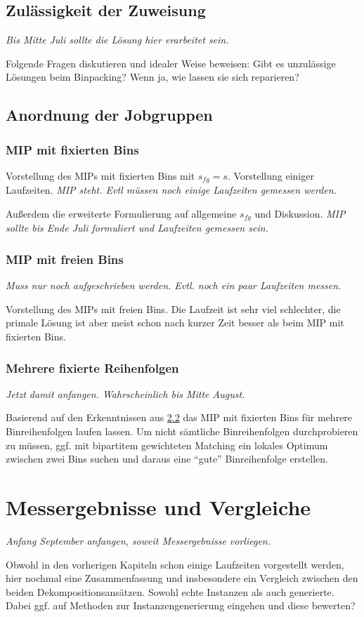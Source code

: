 \documentclass{scrreprt}
\begin{document}
\section{Zulässigkeit der Zuweisung}
\textit{Bis Mitte Juli sollte die Lösung hier erarbeitet sein.}

Folgende Fragen diskutieren und idealer Weise beweisen:
Gibt es unzulässige Lösungen beim Binpacking? Wenn ja, wie lassen sie sich reparieren?


\section{Anordnung der Jobgruppen}
\subsection{MIP mit fixierten Bins}
Vorstellung des MIPs mit fixierten Bins mit $s_{fg}=s$. Vorstellung einiger Laufzeiten. 
\textit{MIP steht. Evtl müssen noch einige Laufzeiten gemessen werden.}

Außerdem die erweiterte Formulierung auf allgemeine $s_{fg}$ und Diskussion.
\textit{MIP sollte bis Ende Juli formuliert und Laufzeiten gemessen sein.}

\subsection{MIP mit freien Bins}
\label{subsec:mipfreibins}
\textit{Muss nur noch aufgeschrieben werden. Evtl. noch ein paar Laufzeiten messen.}

Vorstellung des MIPs mit freien Bins. 
Die Laufzeit ist sehr viel schlechter, die primale Lösung ist aber meist schon nach kurzer Zeit besser als beim MIP mit fixierten Bins.

\subsection{Mehrere fixierte Reihenfolgen}
\textit{Jetzt damit anfangen. Wahrscheinlich bis Mitte August.}

Basierend auf den Erkenntnissen aus \ref{subsec:mipfreibins} das MIP mit fixierten Bins für mehrere Binreihenfolgen laufen lassen.
Um nicht sämtliche Binreihenfolgen durchprobieren zu müssen,
ggf. mit bipartitem gewichteten Matching ein lokales Optimum zwischen zwei Bins suchen und daraus eine "`gute"' Binreihenfolge erstellen.


\chapter{Messergebnisse und Vergleiche}
\textit{Anfang September anfangen, soweit Messergebnisse vorliegen.}

Obwohl in den vorherigen Kapiteln schon einige Laufzeiten vorgestellt werden, hier nochmal eine Zusammenfassung und insbesondere ein Vergleich
zwischen den beiden Dekompositionsansätzen. Sowohl echte Instanzen als auch generierte. 
Dabei ggf. auf Methoden zur Instanzengenerierung eingehen und diese bewerten?
\end{document}
